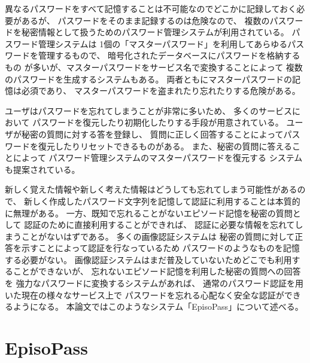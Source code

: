 \documentclass[twoside]{wiss}
\begin{document}
異なるパスワードをすべて記憶することは不可能なのでどこかに記録しておく必要があるが、
パスワードをそのまま記録するのは危険なので、
複数のパスワードを秘密情報として扱うためのパスワード管理システムが利用されている。
パスワード管理システムは
1個の「マスターパスワード」を利用してあらゆるパスワードを管理するもので、
暗号化されたデータベースにパスワードを格納するもの%
\cite{OnePassword}%
\cite{Dashlane}%
\cite{ミルパス}%
\cite{LastPass}%
\cite{KeyPass}%
\cite{NortonIDSafe}%
\cite{IDManager}%
が多いが、マスターパスワードをサービス名で変換することによって
複数のパスワードを生成するシステム\cite{SuperGenPass}もある。
両者ともにマスターパスワードの記憶は必須であり、
マスターパスワードを盗まれたり忘れたりする危険がある。

ユーザはパスワードを忘れてしまうことが非常に多いため、
多くのサービスにおいて
パスワードを復元したり初期化したりする手段が用意されている。
ユーザが秘密の質問に対する答を登録し、
質問に正しく回答することによってパスワードを復元したりリセットできるものがある。
また、秘密の質問に答えることによって
パスワード管理システムのマスターパスワードを復元する
システム\cite{平野亮:2011-11-07}も提案されている。

新しく覚えた情報や新しく考えた情報はどうしても忘れてしまう可能性があるので、
新しく作成したパスワード文字列を記憶して認証に利用することは本質的に無理がある。
一方、既知で忘れることがないエピソード記憶を秘密の質問として
認証のために直接利用することができれば、
認証に必要な情報を忘れてしまうことがないはずである。
多くの画像認証システム\cite{小池英樹:2006-05-15}は
秘密の質問に対して正答を示すことによって認証を行なっているため
パスワードのようなものを記憶する必要がない。
%
画像認証システムはまだ普及していないためどこでも利用することができないが、
忘れないエピソード記憶を利用した秘密の質問への回答を
強力なパスワードに変換するシステムがあれば、
通常のパスワード認証を用いた現在の様々なサービス上で
パスワードを忘れる心配なく安全な認証ができるようになる。
本論文ではこのようなシステム「EpisoPass」について述べる。

\section{EpisoPass}
\end{document}
